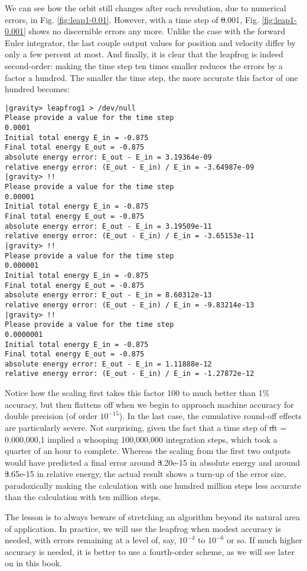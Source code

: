 We can see how the orbit still changes after each revolution, due to
numerical errors, in Fig. \ref{fig:leap1-0.01}.  However, with a time
step of {\st 0.001}, Fig. \ref{fig:leap1-0.001} shows no discernible
errors any more.  Unlike the case with the forward Euler integrator,
the last couple output values for position and velocity differ by only
a few percent at most.  And finally, it is clear that the leapfrog is
indeed second-order: making the time step ten times smaller reduces
the errors by a factor a hundred.  The smaller the time step, the more
accurate this factor of one hundred becomes:

\begin{small}
\begin{verbatim}
|gravity> leapfrog1 > /dev/null
Please provide a value for the time step
0.0001
Initial total energy E_in = -0.875
Final total energy E_out = -0.875
absolute energy error: E_out - E_in = 3.19364e-09
relative energy error: (E_out - E_in) / E_in = -3.64987e-09
|gravity> !!
Please provide a value for the time step
0.00001
Initial total energy E_in = -0.875
Final total energy E_out = -0.875
absolute energy error: E_out - E_in = 3.19509e-11
relative energy error: (E_out - E_in) / E_in = -3.65153e-11
|gravity> !!
Please provide a value for the time step
0.000001
Initial total energy E_in = -0.875
Final total energy E_out = -0.875
absolute energy error: E_out - E_in = 8.60312e-13
relative energy error: (E_out - E_in) / E_in = -9.83214e-13
|gravity> !!
Please provide a value for the time step
0.0000001
Initial total energy E_in = -0.875
Final total energy E_out = -0.875
absolute energy error: E_out - E_in = 1.11888e-12
relative energy error: (E_out - E_in) / E_in = -1.27872e-12
\end{verbatim}
\end{small}

Notice how the scaling first takes this factor 100 to much better than
1\% accuracy, but then flattens off when we begin to approach machine
accuracy for double precision (of order $10^{-15}$).  In the last
case, the cumulative round-off effects are particularly severe.  Not
surprising, given the fact that a time step of {\st dt = 0.000,000,1}
implied a whooping 100,000,000 integration steps, which took a quarter
of an hour to complete.  Whereas the scaling from the first two
outputs would have predicted a final error around {\st 3.20e-15} in
absolute energy and around {\st 3.65e-15} in relative energy, the
actual result shows a turn-up of the error size, paradoxically making
the calculation with one hundred million steps less accurate than the
calculation with ten million steps.

The lesson is to always beware of stretching an algorithm beyond its
natural area of application.  In practice, we will use the leapfrog
when modest accuracy is needed, with errors remaining at a level of,
say, $10^{-4}$ to $10^{-6}$ or so.  If much higher accuracy is needed,
it is better to use a fourth-order scheme, as we will see later on in
this book.
